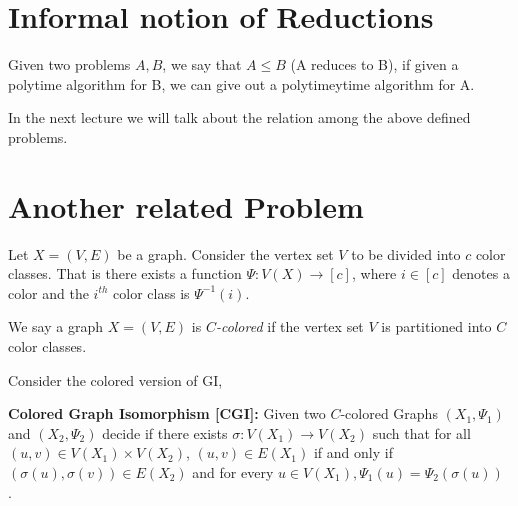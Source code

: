 \vspace{3mm}


\vspace{3mm}


\section{Informal notion of Reductions} 
Given two problems $A,B$, we say that $A \le B$ (A reduces to B), if given a polytime algorithm for B, we can give out a polytimeytime algorithm for A.

In the next lecture we will talk about the relation among the above defined problems.




\section{Another related Problem}
Let $X=(V,E)$ be a graph. Consider the vertex set 
$V$ to be divided into $c$ color classes. That is there exists a function $\Psi : V(X) \rightarrow [c]$,
where $i \in [c]$ denotes a color and the $i^{th}$ color class is $\Psi^{-1}(i)$.

We say a graph $X=(V,E)$ is {\em $C$-colored} if
the vertex set $V$ is partitioned into $C$ color classes.

Consider the colored version of GI,

\textbf{Colored Graph Isomorphism [CGI]:} Given two $C$-colored Graphs $(X_1,\Psi_1)$ and $(X_2,\Psi_2)$
decide if there exists $\sigma : V(X_1) \rightarrow V(X_2)$ such that for all
$(u,v) \in V(X_1)\times V(X_2)$,  $(u,v) \in E(X_1)$ if and only if $(\sigma(u), \sigma(v)) \in E(X_2) $
 and for every $u \in V(X_1),\Psi_1(u) = \Psi_2(\sigma(u))$ .

